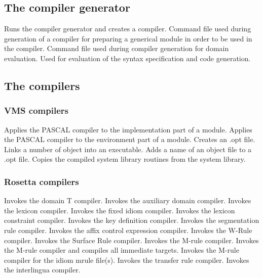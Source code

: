 \subsection{The compiler generator}
\bsc
{} Runs the compiler generator and creates a compiler.
 Command file used during generation of a compiler
                       for preparing a generical module in order to be
                        used in the compiler.
 Command file used during compiler generation for
                      domain evaluation.
 Used for evaluation of the syntax specification and
                      code generation.
\esc
\subsection{The compilers}
\subsubsection{VMS compilers}
\bsc
{} Applies the PASCAL compiler to the implementation part of a
                   module.
 Applies the PASCAL compiler to the environment part of a
                   module.
 Creates an .opt file.
 Links a number of object into an executable.
 Adds a name of an object file to a .opt file.
 Copies the  compiled system library  routines from
                         the system library.
\esc
\subsubsection{Rosetta compilers}
\bsc
{} Invokes the domain T compiler.
 Invokes the auxiliary domain compiler.
 Invokes the lexicon compiler.
 Invokes the fixed idiom compiler.
 Invokes the lexicon constraint compiler.
 Invokes the key definition compiler.
 Invokes the segmentation rule compiler.
 Invokes the affix control expression compiler.
 Invokes the W-Rule compiler.
 Invokes the Surface Rule compiler.
 Invokes the M-rule compiler.
 Invokes the M-rule compiler and compiles all immediate
                      targets.
 Invokes the M-rule compiler for the idiom mrule file(s).
 Invokes the transfer rule compiler.
 Invokes the interlingua compiler.
\esc
